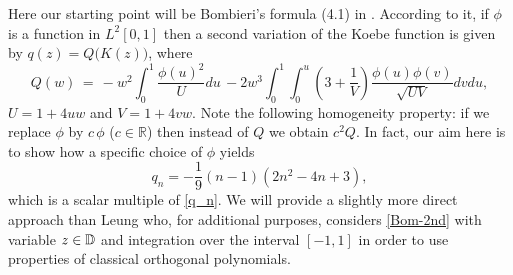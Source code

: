 \documentclass[11pt,reqno]{amsart}
\theoremstyle{plain}
\theoremstyle{definition}
\theoremstyle{remark}
\newcommand {\SR}{{\mathbb R}}  \newcommand{\ST}{{\mathbb T}}  \newcommand{\SZ}{{\mathbb Z}}
\newcommand{\be}{\begin{equation}}
\newcommand{\ee}{\end{equation}}
\begin{document}
Here our starting point will be Bombieri's formula (4.1) in \cite{Bom}. According to it, if $\phi$ is a function in $L^2[0,1]$ then a second variation of the Koebe function is given by $q(z) = Q\big(K(z)\big)$, where
\be \label{Bom-2nd}
Q(w) \, = \, - w^2 \int_0^1 \frac{\phi(u)^2}{U} du \, - 2w^3 \int_0^1  \int_0^u \left(3+\frac{1}{V}\right) \frac{\phi(u)\phi(v)}{\sqrt{UV}} dv du,
\ee
$U=1+4uw$ and $V=1+4vw$. Note the following homogeneity property: if we replace $\phi$ by $c \, \phi$ ($c\in\SR$) then instead of $Q$ we obtain $c^2Q$. In fact, our aim here is to show how a specific choice of $\phi$ yields 
$$
q_n = -\frac{1}{9}(n-1)(2n^2 -4n+3),
$$
which is a scalar multiple of \eqref{q_n}. We will provide a slightly more direct approach than Leung who, for additional purposes, considers \eqref{Bom-2nd} with variable $z\in{\mathbb D}$ and integration over the interval $[-1,1]$ in order to use properties of classical orthogonal polynomials. 
\end{document}
